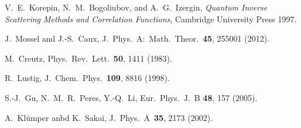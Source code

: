 \documentclass[twocolumn,superscriptaddress,prb,10pt]{revtex4-1}
\begin{document}
\begin{thebibliography}{99}
V.~E.~Korepin, N.~M.~Bogoliubov, and A.~G.~Izergin, \emph{Quantum 
Inverse Scattering Methods and Correlation Functions}, Cambridge 
University Press 1997. 

J.~Mossel and J.-S.~Caux, J.\ Phys.\ A:\ Math.\ Theor.\ {\bf 45}, 
255001 (2012). 


M.~Creutz, Phys.\ Rev.\ Lett.\ {\bf 50}, 1411 (1983).

R.~Lustig, J.\ Chem.\ Phys.\ {\bf 109}, 8816 (1998).

S.-J.~Gu, N.~M.~R.~Peres, Y.-Q.~Li, Eur.\ Phys.\ J.\ B {\bf 48}, 157 (2005). 

A.~Kl\"umper anbd K.~Sakai, J.\ Phys.\ A\ {\bf 35}, 2173 (2002).

\end{thebibliography}
\end{document}
